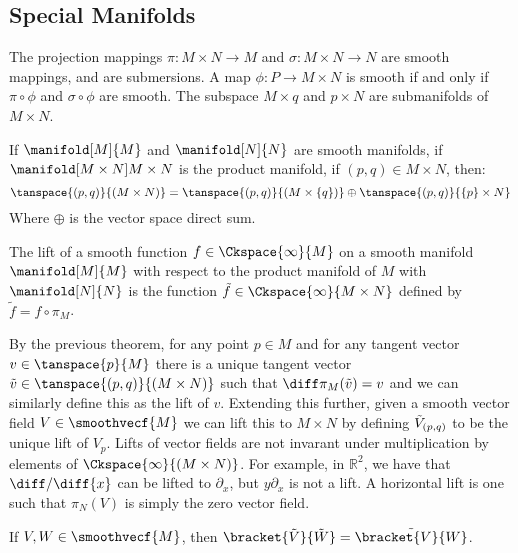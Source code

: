     \subsection{Special Manifolds}
        The projection mappings $\pi:M\times{N}\rightarrow{M}$ and
        $\sigma:M\times{N}\rightarrow{N}$ are smooth mappings, and are
        submersions. A map $\phi:{P}\rightarrow{M}\times{N}$ is smooth if
        and only if $\pi\circ\phi$ and $\sigma\circ\phi$ are smooth. The
        subspace $M\times{q}$ and $p\times{N}$ are submanifolds of
        $M\times{N}$.
        \begin{theorem}
            If $\manifold[M]{M}$ and $\manifold[N]{N}$ are smooth manifolds,
            if $\manifold[M\times{N}]{M\times{N}}$ is the product manifold,
            if $(p,q)\in{M}\times{N}$, then:
            \begin{equation}
                \tanspace{(p,q)}{(M\times{N})}
                =\tanspace{(p,q)}{(M\times\{q\})}\oplus
                \tanspace{(p,q)}{\{p\}\times{N}}
            \end{equation}
            Where $\oplus$ is the vector space direct sum.
        \end{theorem}
        \begin{definition}
            The lift of a smooth function $f\in\Ckspace{\infty}{M}$ on a
            smooth manifold $\manifold[M]{M}$ with respect to the product
            manifold of $M$ with $\manifold[N]{N}$ is the function
            $\tilde{f}\in\Ckspace{\infty}{M\times{N}}$ defined by
            $\tilde{f}=f\circ\pi_{M}$.
        \end{definition}
        By the previous theorem, for any point $p\in{M}$ and for any tangent
        vector $v\in\tanspace{p}{M}$ there is a unique tangent vector
        $\tilde{v}\in\tanspace{(p,q)}{(M\times{N})}$ such that
        $\diff\pi_{M}(\tilde{v})=v$ and we can similarly define this as the
        lift of $v$. Extending this further, given a smooth vector field
        $V\in\smoothvecf{M}$ we can lift this to $M\times{N}$ by defining
        $\Tilde{V}_{(p,q)}$ to be the unique lift of $V_{p}$. Lifts of
        vector fields are not invarant under multiplication by elements of
        $\Ckspace{\infty}{(M\times{N})}$. For example, in $\mathbb{R}^{2}$,
        we have that $\diff/\diff{x}$ can be lifted to $\partial_{x}$, but
        $y\partial_{x}$ is not a lift. A horizontal lift is one such that
        $\pi_{N}(V)$ is simply the zero vector field.
        \begin{theorem}
            If $V,W\in\smoothvecf{M}$, then
            $\bracket{\tilde{V}}{\tilde{W}}=\tilde{\bracket{V}{W}}$.
        \end{theorem}
